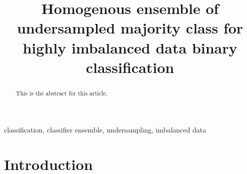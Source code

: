 \documentclass[pmlr]{jmlr}
\title
[Homogenous ensemble of undersampled majority class]
{
	Homogenous ensemble of undersampled majority class for highly imbalanced data binary classification%
}
\begin{document}
\maketitle

\begin{abstract}
This is the abstract for this article.
\end{abstract}
\begin{keywords}
classification, classifier ensemble, undersampling, imbalanced data
\end{keywords}

\section{Introduction}
\label{sec:intro}



\end{document}
